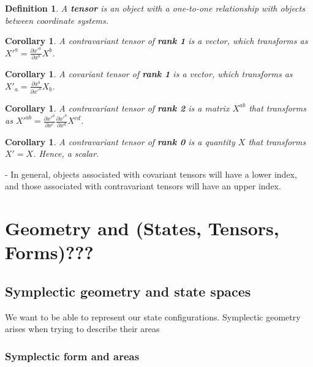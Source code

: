 \documentclass{book}
\newtheorem{defn}[equation]{Definition}
\newtheorem{coro}[equation]{Corollary}
\begin{document}
\begin{defn}
	A \textbf{tensor} is an object with a one-to-one relationship with objects between coordinate systems. 
\end{defn}

\begin{coro}
	A contravariant tensor of \textbf{rank 1} is a vector, which transforms as  $X'^a = \frac{\partial x'^a}{\partial x^b} X^b$.  
\end{coro}

\begin{coro}
	A covariant tensor of \textbf{rank 1} is a vector, which transforms as $X'_a = \frac{\partial x^b}{\partial x'^a} X_b$. 
\end{coro}

\begin{coro}
	A contravariant tensor of \textbf{rank 2} is a matrix $X^{ab}$ that transforms as $X'^{ab} = \frac{\partial x'^a}{\partial x^c} \frac{\partial x'^b}{\partial x^d} X^{cd}$. 
\end{coro}

\begin{coro}
	A contravariant tensor of \textbf{rank 0} is a quantity $X$ that transforms $X' = X$. Hence, a scalar. 
\end{coro}

- In general, objects associated with covariant tensors will have a lower index, and those associated with contravariant tensors will have an upper index. 












\chapter{Geometry and (States, Tensors, Forms)???}


\section{Symplectic geometry and state spaces}
We want to be able to represent our state configurations. Symplectic geometry arises when trying to describe their areas

\subsection{Symplectic form and areas}
\end{document}
